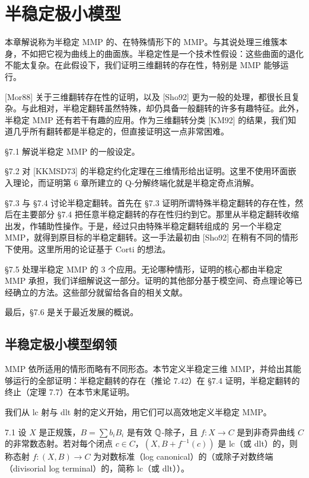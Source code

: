 \chapter{半稳定极小模型}

本章解说称为半稳定 MMP 的、在特殊情形下的 MMP。与其说处理三维簇本身，不如把它视为曲线上的曲面族。半稳定性是一个技术性假设：这些曲面的退化不能太复杂。在此假设下，我们证明三维翻转的存在性，特别是 MMP 能够运行。

[Mor88] 关于三维翻转存在性的证明，以及 [Sho92] 更为一般的处理，都很长且复杂。与此相对，半稳定翻转虽然特殊，却仍具备一般翻转的许多有趣特征。此外，半稳定 MMP 还有若干有趣的应用。作为三维翻转分类 [KM92] 的结果，我们知道几乎所有翻转都是半稳定的，但直接证明这一点非常困难。

§7.1 解说半稳定 MMP 的一般设定。

§7.2 对 [KKMSD73] 的半稳定约化定理在三维情形给出证明。这里不使用环面嵌入理论，而证明第 6 章所建立的 Q-分解终端化就是半稳定奇点消解。

§7.3 与 §7.4 讨论半稳定翻转。首先在 §7.3 证明所谓特殊半稳定翻转的存在性，然后在主要部分 §7.4 把任意半稳定翻转的存在性归约到它。那里从半稳定翻转收缩出发，作辅助性操作。于是，经过只由特殊半稳定翻转组成的
另一个半稳定 MMP，就得到原目标的半稳定翻转。这一手法最初由 [Sho92] 在稍有不同的情形下使用。这里所用的论证基于 Corti 的想法。

§7.5 处理半稳定 MMP 的 3 个应用。无论哪种情形，证明的核心都由半稳定 MMP 承担，我们详细解说这一部分。证明的其他部分基于模空间、奇点理论等已经确立的方法。这些部分就留给各自的相关文献。

最后，§7.6 是关于最近发展的概说。

\section{半稳定极小模型纲领}

MMP 依所适用的情形而略有不同形态。本节定义半稳定三维 MMP，并给出其能够运行的全部证明：半稳定翻转的存在（推论 7.42）在 §7.4 证明，半稳定翻转的终止（定理 7.7）在本节末尾证明。

我们从 lc 射与 dlt 射的定义开始，用它们可以高效地定义半稳定 MMP。

\begin{definition}{7.1}
设 $X$ 是正规簇，$B=\sum b_iB_i$ 是有效 $\mathbb{Q}$-除子，且 $f\colon X\to C$ 是到非奇异曲线 $C$ 的非常数态射。若对每个闭点 $c\in C$，$(X,B+f^{-1}(c))$ 是 lc（或 dlt）的，则称态射 $f\colon(X,B)\to C$ 为对数标准（log canonical）的（或除子对数终端（divisorial log terminal）的，简称 lc（或 dlt））。
\end{definition}

